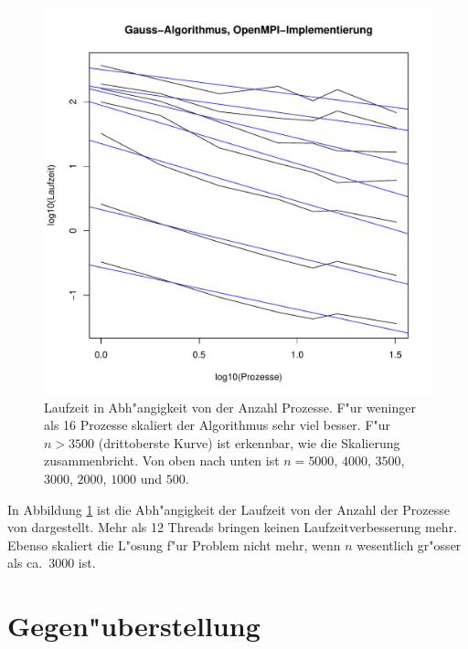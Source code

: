 \begin{figure}
\begin{center}
\includegraphics[width=\hsize]{images/gauss-threads.pdf}
\end{center}
\caption{Laufzeit in Abh"angigkeit von der Anzahl Prozesse.
F"ur weninger als 16 Prozesse skaliert der Algorithmus sehr viel besser.
F"ur $n>3500$ (drittoberste Kurve) ist erkennbar, wie die Skalierung
zusammenbricht. 
Von oben nach unten ist $n=5000$, $4000$, $3500$, $3000$, $2000$, $1000$
und $500$.
\label{openmpi-threads}}
\end{figure}
In Abbildung \ref{openmpi-threads} ist die Abh"angigkeit der Laufzeit von
der Anzahl der Prozesse von dargestellt. Mehr als 12 Threads bringen
keinen Laufzeitverbesserung mehr. Ebenso skaliert die L"osung f"ur 
Problem nicht mehr, wenn $n$ wesentlich gr"osser als ca.~3000 ist.

\section{Gegen"uberstellung}


